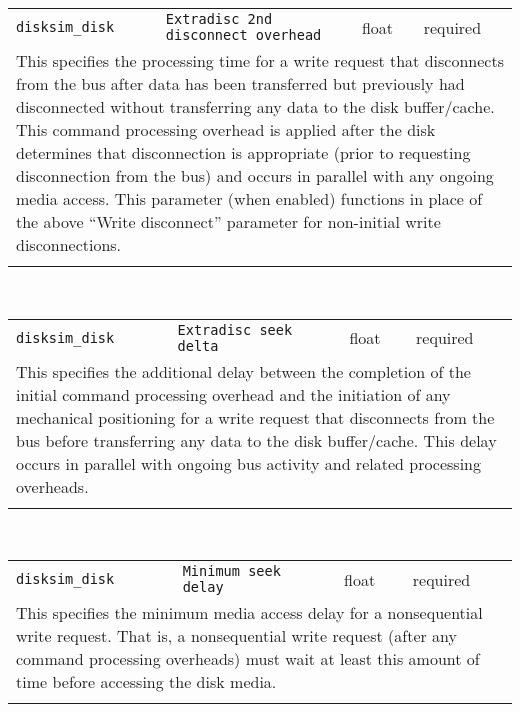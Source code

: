 \begin{tabular}{|p{1.5in}|p{3.5in}|p{0.5in}|p{0.5in}|}
\cline{1-4}
\texttt{disksim\_disk} & \texttt{Extradisc 2nd disconnect overhead} & float & required \\ 
\cline{1-4}
\multicolumn{4}{|p{6in}|}{
This specifies the processing time for a write request that disconnects
from the bus after data has been transferred but previously had
disconnected without transferring any data to the disk buffer/cache.
This command processing overhead is applied after the disk determines
that disconnection is appropriate (prior to requesting disconnection
from the bus) and occurs in parallel with any ongoing media access.
This parameter (when enabled) functions in place of the above ``Write
disconnect'' parameter for non-initial write disconnections.
}\\ 
\cline{1-4}
\multicolumn{4}{p{5in}}{}\\
\end{tabular}\\ 
\noindent 
\begin{tabular}{|p{1.5in}|p{3.5in}|p{0.5in}|p{0.5in}|}
\cline{1-4}
\texttt{disksim\_disk} & \texttt{Extradisc seek delta} & float & required \\ 
\cline{1-4}
\multicolumn{4}{|p{6in}|}{
This specifies the additional delay between the completion of the initial
command processing overhead and the initiation of any mechanical
positioning for a write request that disconnects from the bus before
transferring any data to the disk buffer/cache. This delay occurs in
parallel with ongoing bus activity and related processing overheads.
}\\ 
\cline{1-4}
\multicolumn{4}{p{5in}}{}\\
\end{tabular}\\ 
\noindent 
\begin{tabular}{|p{1.5in}|p{3.5in}|p{0.5in}|p{0.5in}|}
\cline{1-4}
\texttt{disksim\_disk} & \texttt{Minimum seek delay} & float & required \\ 
\cline{1-4}
\multicolumn{4}{|p{6in}|}{
This specifies the minimum media access delay for a nonsequential write
request. That is, a nonsequential write request (after any command
processing overheads) must wait at least this amount of time before
accessing the disk media.
}\\ 
\cline{1-4}
\multicolumn{4}{p{5in}}{}\\
\end{tabular}\\ 
